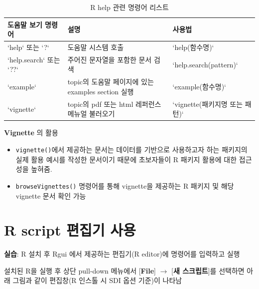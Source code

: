 \documentclass[
  11pt,
]{krantz}
\providecommand{\tightlist}{%
  \setlength{\itemsep}{0pt}\setlength{\parskip}{0pt}}
\let\BeginKnitrBlock\begin \let\EndKnitrBlock\end
\begin{document}
\begin{table}[H]

\caption{\label{tab:tab-help}R help 관련 명령어 리스트}
\centering
\fontsize{10}{12}\selectfont
\begin{tabular}[t]{l>{\raggedright\arraybackslash}p{5cm}l}
\toprule
도움말 보기 명령어 & 설명 & 사용법\\
\midrule
\rowcolor{gray!6}  `help` 또는 `?` & 도움말 시스템 호출 & `help(함수명)`\\
`help.search` 또는 `??` & 주어진 문자열을 포함한 문서 검색 & `help.search(pattern)`\\
\rowcolor{gray!6}  `example` & topic의 도움말 페이지에 있는 examples section 실행 & `example(함수명)`\\
`vignette` & topic의 pdf 또는 html 레퍼런스 메뉴얼 불러오기 & `vignette(패키지명 또는 패턴)`\\
\bottomrule
\end{tabular}
\end{table}

\normalsize

\footnotesize

\BeginKnitrBlock{rmdtip}
\textbf{Vignette} 의 활용

\begin{itemize}
\tightlist
\item
  \texttt{vignette()}에서 제공하는 문서는 데이터를 기반으로 사용하고자 하는 패키지의 실제 활용 예시를 작성한 문서이기 때문에 초보자들이 R 패키지 활용에 대한 접근성을 높혀줌.
\item
  \texttt{browseVignettes()} 명령어를 통해 vignette을 제공하는 R 패키지 및 해당 vignette 문서 확인 가능
\end{itemize}
\EndKnitrBlock{rmdtip}

\normalsize

\hypertarget{rconsle-script}{%
\section{R script 편집기 사용}\label{rconsle-script}}

\BeginKnitrBlock{rmdimportant}
\textbf{실습}: R 설치 후 Rgui 에서 제공하는 편집기(R editor)에 명령어를 입력하고 실행
\EndKnitrBlock{rmdimportant}

설치된 R을 실행 후 상단 pull-down 메뉴에서 {[}\textbf{File}{]} \(\rightarrow\) {[}\textbf{새 스크립트}{]}를 선택하면 아래 그림과 같이 편집창(R 인스톨 시 SDI 옵션 기준)이 나타남

\footnotesize
\end{document}

